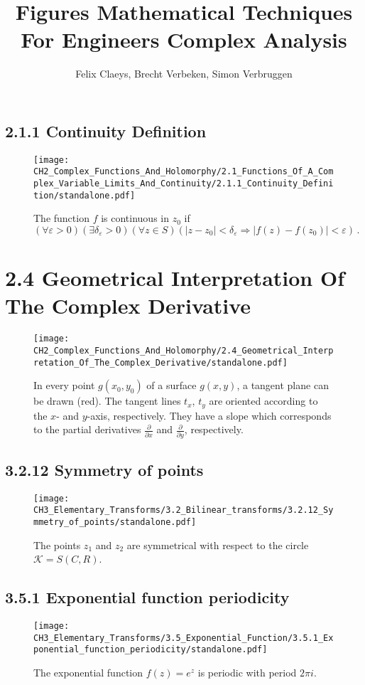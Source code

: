 \documentclass{book}
\title{Figures Mathematical Techniques For Engineers Complex Analysis}
\author{Felix Claeys, Brecht Verbeken, Simon Verbruggen}
\begin{document}
\maketitle
\subsection*{2.1.1 Continuity Definition}
\begin{figure}[H]
\centering
\texttt{[image: CH2\_Complex\_Functions\_And\_Holomorphy/2.1\_Functions\_Of\_A\_Complex\_Variable\_Limits\_And\_Continuity/2.1.1\_Continuity\_Definition/standalone.pdf]}
\caption{The function $f$ is continuous in $z_0$ if $( \forall \varepsilon > 0)(\exists \delta_\varepsilon > 0)(\forall z \in S)(|z-z_0|<\delta_\varepsilon \Longrightarrow |f(z) - f(z_0)|<\varepsilon)\, . $}
\end{figure}

\section*{2.4 Geometrical Interpretation Of The Complex Derivative}
\begin{figure}[H]
\centering
\texttt{[image: CH2\_Complex\_Functions\_And\_Holomorphy/2.4\_Geometrical\_Interpretation\_Of\_The\_Complex\_Derivative/standalone.pdf]}
\caption{In every point  $g(x_0, y_0)$ of a surface $g(x,y)$, a tangent plane can be drawn (red). The tangent lines $t_x$, $t_y$ are oriented according to the $x$- and $y$-axis, respectively. They have a slope which corresponds to the partial derivatives $\frac{\partial}{\partial x}$ and $\frac{\partial}{\partial y}$, respectively.}
\end{figure}

\subsection*{3.2.12 Symmetry of points}
\begin{figure}[H]
\centering
\texttt{[image: CH3\_Elementary\_Transforms/3.2\_Bilinear\_transforms/3.2.12\_Symmetry\_of\_points/standalone.pdf]}
\caption{The points $z_1$ and $z_2$ are symmetrical with respect to the circle $\mathcal{K} = S(C,R)$.}
\end{figure}

\subsection*{3.5.1 Exponential function periodicity}
\begin{figure}[H]
\centering
\texttt{[image: CH3\_Elementary\_Transforms/3.5\_Exponential\_Function/3.5.1\_Exponential\_function\_periodicity/standalone.pdf]}
\caption{The exponential function $f(z) =e^z$ is periodic with period $2 \pi i$.}
\end{figure}
\end{document}
